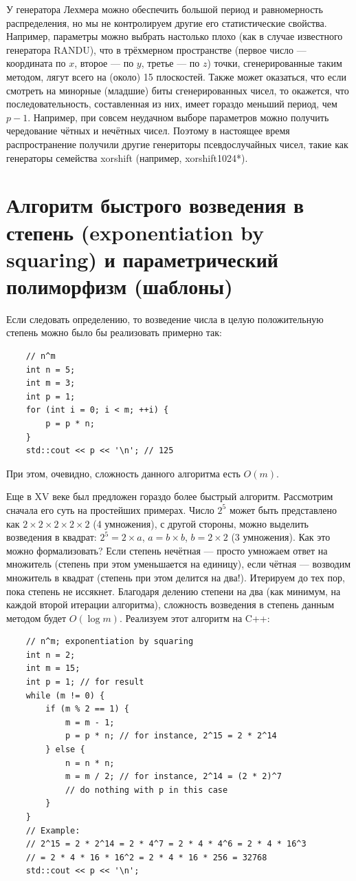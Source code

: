 \documentclass{book}
\begin{document}
У генератора Лехмера можно обеспечить большой период и равномерность распределения, но мы не
контролируем другие его статистические свойства. Например, параметры
можно выбрать настолько плохо (как в случае известного генератора RANDU), что в трёхмерном пространстве (первое число --- координата
по $x$, второе --- по $y$, третье --- по $z$) точки, сгенерированные таким методом, лягут всего на (около) 15
плоскостей. Также может оказаться, что если смотреть на минорные (младшие) биты сгенерированных
чисел, то окажется, что последовательность, составленная из них, имеет гораздо меньший период, чем
$p - 1$. Например, при совсем неудачном выборе параметров можно получить чередование чётных и нечётных
чисел. Поэтому в настоящее время распространение получили другие генериторы псевдослучайных чисел,
такие
как генераторы семейства xorshift (например, xorshift1024*).

\section{Алгоритм быстрого возведения в степень (exponentiation by squaring) и параметрический
полиморфизм (шаблоны)}

Если следовать определению, то возведение числа в целую положительную степень можно было бы
реализовать примерно так:
\begin{verbatim}
    // n^m
    int n = 5;
    int m = 3;
    int p = 1;
    for (int i = 0; i < m; ++i) {
        p = p * n;
    }
    std::cout << p << '\n'; // 125
\end{verbatim}
При этом, очевидно, сложность данного алгоритма есть $O(m)$.

Еще в XV веке был предложен гораздо более быстрый алгоритм. Рассмотрим сначала его суть на
простейших примерах. Число $2^5$ может быть представлено как $2 \times 2 \times 2 \times 2 \times
2$ (4 умножения), с другой стороны, можно выделить возведения в квадрат: $2^5 = 2 \times a$, $a = b
\times b$, $b = 2 \times 2$ (3 умножения). Как это можно формализовать? Если степень нечётная --- просто
умножаем ответ на множитель (степень при этом уменьшается на единицу), если чётная --- возводим
множитель в квадрат (степень при этом делится на два!). Итерируем до тех пор,
пока степень не иссякнет. Благодаря делению степени на два (как минимум, на каждой второй итерации
алгоритма), сложность возведения в степень данным методом будет $O(\log m)$. Реализуем этот
алгоритм на C++:
\begin{verbatim}
    // n^m; exponentiation by squaring
    int n = 2;
    int m = 15;
    int p = 1; // for result
    while (m != 0) {
        if (m % 2 == 1) {
            m = m - 1;
            p = p * n; // for instance, 2^15 = 2 * 2^14
        } else {
            n = n * n;
            m = m / 2; // for instance, 2^14 = (2 * 2)^7
            // do nothing with p in this case
        }
    }
    // Example:
    // 2^15 = 2 * 2^14 = 2 * 4^7 = 2 * 4 * 4^6 = 2 * 4 * 16^3
    // = 2 * 4 * 16 * 16^2 = 2 * 4 * 16 * 256 = 32768
    std::cout << p << '\n';
\end{verbatim}
\end{document}
